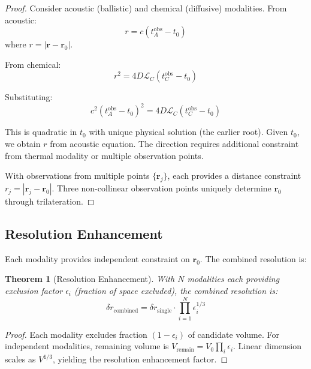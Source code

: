 \documentclass[11pt,a4paper]{article}
\newtheorem{theorem}{Theorem}[section]
\theoremstyle{remark}
\newcommand{\rxnpos}{\mathbf{r}_0}
\newcommand{\rxntime}{t_0}
\newcommand{\obspos}{\mathbf{r}}
\begin{document}
\begin{proof}
Consider acoustic (ballistic) and chemical (diffusive) modalities. From acoustic:
\begin{equation}
    r = c(t_A^{\text{obs}} - \rxntime)
\end{equation}
where $r = |\obspos - \rxnpos|$.

From chemical:
\begin{equation}
    r^2 = 4D\mathcal{L}_C(t_C^{\text{obs}} - \rxntime)
\end{equation}

Substituting:
\begin{equation}
    c^2(t_A^{\text{obs}} - \rxntime)^2 = 4D\mathcal{L}_C(t_C^{\text{obs}} - \rxntime)
\end{equation}

This is quadratic in $\rxntime$ with unique physical solution (the earlier root). Given $\rxntime$, we obtain $r$ from acoustic equation. The direction requires additional constraint from thermal modality or multiple observation points.

With observations from multiple points $\{\obspos_j\}$, each provides a distance constraint $r_j = |\obspos_j - \rxnpos|$. Three non-collinear observation points uniquely determine $\rxnpos$ through trilateration.
\end{proof}

\subsection{Resolution Enhancement}

Each modality provides independent constraint on $\rxnpos$. The combined resolution is:

\begin{theorem}[Resolution Enhancement]
\label{thm:resolution}
With $N$ modalities each providing exclusion factor $\epsilon_i$ (fraction of space excluded), the combined resolution is:
\begin{equation}
    \delta r_{\text{combined}} = \delta r_{\text{single}} \cdot \prod_{i=1}^N \epsilon_i^{1/3}
\end{equation}
\end{theorem}

\begin{proof}
Each modality excludes fraction $(1-\epsilon_i)$ of candidate volume. For independent modalities, remaining volume is $V_{\text{remain}} = V_0 \prod_i \epsilon_i$. Linear dimension scales as $V^{1/3}$, yielding the resolution enhancement factor.
\end{proof}
\end{document}
